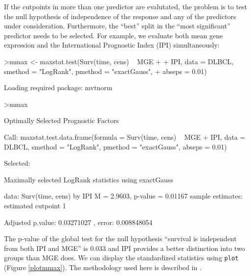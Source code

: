 \documentclass{article}
\renewcommand{\baselinestretch}{1.5}
\begin{document}
If the cutpoints in more than one predictor are evalutated, the problem is
to test the null hypothesis of independence of the response and any of the
predictors under consideration. Furthermore, the ``best'' split in the
``most significant'' predictor needs to be selected. For example, we
evaluate both mean gene expression and the International Prognostic Index
(IPI) simultaneously:

\renewcommand{\baselinestretch}{1}
\begin{Schunk}
\begin{Sinput}
>mmax <- maxstat.test(Surv(time, cens) ~ MGE + 
+     IPI, data = DLBCL, smethod = "LogRank", pmethod = "exactGauss", 
+     abseps = 0.01)
\end{Sinput}
\begin{Soutput}
Loading required package: mvtnorm 
\end{Soutput}
\begin{Sinput}
>mmax
\end{Sinput}
\begin{Soutput}
	 Optimally Selected Prognostic Factors 

Call: maxstat.test.data.frame(formula = Surv(time, cens) ~ MGE + IPI, 
    data = DLBCL, smethod = "LogRank", pmethod = "exactGauss", 
    abseps = 0.01)


 Selected: 

	Maximally selected LogRank statistics using
	exactGauss

data:  Surv(time, cens) by IPI 
M = 2.9603, p-value = 0.01167
sample estimates:
estimated cutpoint 
                 1 

Adjusted p.value: 
0.03271027 , error:  0.008848054 
\end{Soutput}
\end{Schunk}
\renewcommand{\baselinestretch}{1.5}

The p-value of the global test for the null hypothesis ``survival is
independent from both IPI and MGE'' is 0.033 
and IPI provides a better distinction into two groups than 
MGE does. We can display the
standardized statistics using \texttt{plot} (Figure \ref{plotmmax}). The
methodology used here is described in \cite{lausenetal:2002}.
\end{document}
